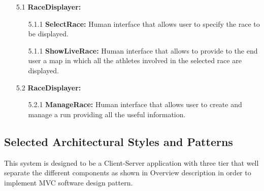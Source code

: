 \begin{enumerate}
\item[5.1] \textbf{RaceDisplayer: }
	\begin{enumerate}
		\item[5.1.1] \textbf{SelectRace:} Human interface that allows user to specify the race to be displayed.
		\item[5.1.1] \textbf{ShowLiveRace:}  Human interface that allows to provide to the end user a map in which all the athletes involved in the selected race are displayed.
	\end{enumerate}	

\item[5.2] \textbf{RaceDisplayer: }
	\begin{enumerate}
		\item[5.2.1] \textbf{ManageRace: } Human interface that allows user to create and manage a run providing all the useful information.
	\end{enumerate}		

\end{enumerate}




\subsection{Selected Architectural Styles and Patterns}

This system is designed to be a Client-Server application with three tier that well separate the different components as shown in Overview description in order to implement MVC software design pattern.

